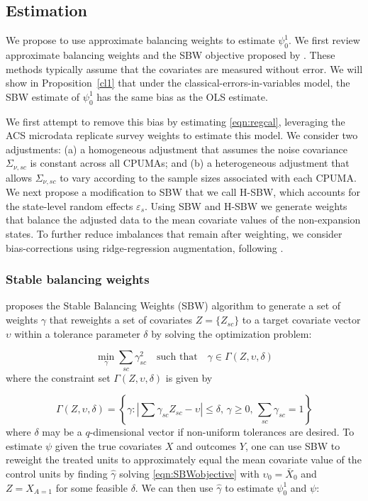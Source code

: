 \documentclass[aoas]{imsart}
\theoremstyle{plain}
\theoremstyle{remark}
\begin{document}
\subsection{Estimation}\label{ssec:estimation}

We propose to use approximate balancing weights to estimate $\psi_0^1$. We first review approximate balancing weights and the SBW objective proposed by \cite{zubizarreta2015stable}. These methods typically assume that the covariates are measured without error. We will show in Proposition~\ref{cl1} that under the classical-errors-in-variables model, the SBW estimate of $\psi_0^1$ has the same bias as the OLS estimate.

We first attempt to remove this bias by estimating \eqref{eqn:regcal}, leveraging the ACS microdata replicate survey weights to estimate this model. We consider two adjustments: (a) a homogeneous adjustment that assumes the noise covariance $\Sigma_{\nu, sc}$ is constant across all CPUMAs; and (b) a heterogeneous adjustment that allows $\Sigma_{\nu,sc}$ to vary according to the sample sizes associated with each CPUMA. We next propose a modification to SBW that we call H-SBW, which accounts for the state-level random effects $\varepsilon_s$. Using SBW and H-SBW we generate weights that balance the adjusted data to the mean covariate values of the non-expansion states. To further reduce imbalances that remain after weighting, we consider bias-corrections using ridge-regression augmentation, following \cite{ben2021augmented}. 

\subsubsection{Stable balancing weights}\label{ssec:SBW}

\cite{zubizarreta2015stable} proposes the Stable Balancing Weights (SBW) algorithm to generate a set of weights $\gamma$ that reweights a set of covariates $Z = \{Z_{sc}\}$ to a target covariate vector $\upsilon$ within a tolerance parameter $\delta$ by solving the optimization problem:

\begin{equation}\label{eqn:SBWobjective}
 \min_{\gamma} \sum_{sc} \gamma_{sc}^2 \quad \text{such that} \quad \gamma \in \Gamma(Z, \upsilon, \delta)
\end{equation}
%
where the constraint set $\Gamma(Z, \upsilon, \delta)$ is given by

\[ \Gamma(Z, \upsilon, \delta) = \left\{\gamma: \left|\sum \gamma_{sc} Z_{sc}  - \upsilon\right| \leq \delta,\, \gamma \geq 0,\, \sum_{sc} \gamma_{sc} = 1\right\}\]
%
where $\delta$ may be a $q$-dimensional vector if non-uniform tolerances are desired. To estimate $\psi$ given the true covariates $X$ and outcomes $Y$, one can use SBW to reweight the treated units to approximately equal the mean covariate value of the control units by finding $\hat{\gamma}$ solving \eqref{eqn:SBWobjective} with $\upsilon_0 = \bar{X}_0$ and $Z = X_{A=1}$ for some feasible $\delta$. We can then use $\hat{\gamma}$ to estimate $\psi_0^1$ and $\psi$:
\end{document}

